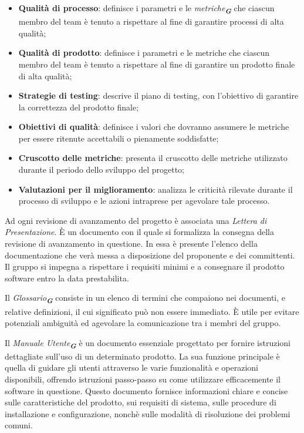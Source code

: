 \begin{itemize}
    \item \textbf{Qualità di processo}: definisce i parametri e le \emph{metriche}\textsubscript{\textit{\textbf{G}}} che ciascun membro del
    team è tenuto a rispettare al fine di garantire processi di alta qualità;
    \item \textbf{Qualità di prodotto}: definisce i parametri e le metriche che ciascun membro del team
    è tenuto a rispettare al fine di garantire un prodotto finale di alta qualità;
    \item \textbf{Strategie di testing}: descrive il piano di testing, con l’obiettivo di garantire la correttezza del prodotto finale;    
    \item \textbf{Obiettivi di qualità}: definisce i valori  che dovranno assumere le metriche per essere ritenute accettabili o pienamente soddisfatte;
    \item \textbf{Cruscotto delle metriche}: presenta il cruscotto delle metriche utilizzato durante il periodo dello sviluppo del progetto;
    \item \textbf{Valutazioni per il miglioramento}: analizza le criticità rilevate durante il processo di sviluppo e le azioni intraprese per agevolare tale processo.
\end{itemize}

Ad ogni revisione di avanzamento del progetto è associata una \emph{Lettera di Presentazione}.
È un documento con il quale si formalizza la consegna della revisione di avanzamento in questione. 
In essa è presente l’elenco della documentazione che verà messa a disposizione del proponente e dei committenti. 
Il gruppo si impegna a rispettare i requisiti minimi e a consegnare il prodotto software entro la data prestabilita.

Il \emph{Glossario}\textsubscript{\textit{\textbf{G}}} consiste in un elenco di termini che compaiono nei documenti, e relative definizioni, 
il cui significato può non essere immediato. È utile per evitare potenziali ambiguità ed agevolare la comunicazione tra i membri del gruppo.

Il \emph{Manuale Utente}\textsubscript{\textit{\textbf{G}}} è un documento essenziale progettato per fornire istruzioni dettagliate
sull’uso di un determinato prodotto. La sua funzione principale è quella di guidare gli utenti attraverso le varie funzionalità e operazioni disponibili, 
offrendo istruzioni passo-passo su come utilizzare efficacemente il software in questione. Questo documento fornisce informazioni chiare e concise 
sulle caratteristiche del prodotto, sui requisiti di sistema, sulle procedure di installazione e configurazione, nonchè sulle modalità 
di risoluzione dei problemi comuni.

